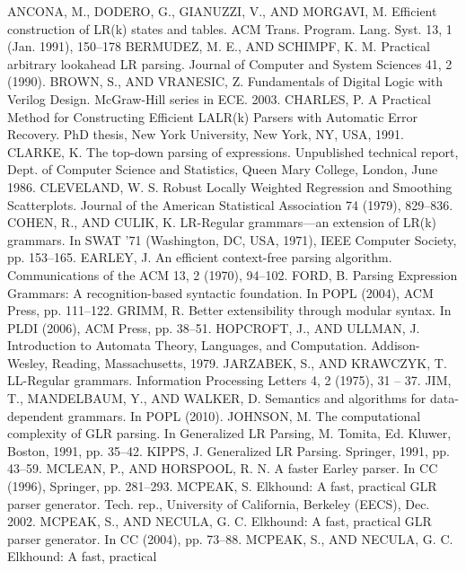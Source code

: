 \begin{thebibliography}{99}
ANCONA, M., DODERO, G., GIANUZZI, V., AND MORGAVI,
M. Efficient construction of LR(k) states and tables. ACM
Trans. Program. Lang. Syst. 13, 1 (Jan. 1991), 150–178
BERMUDEZ, M. E., AND SCHIMPF, K. M. Practical arbitrary
lookahead LR parsing. Journal of Computer and System Sciences
41, 2 (1990).
BROWN, S., AND VRANESIC, Z. Fundamentals of Digital Logic
with Verilog Design. McGraw-Hill series in ECE. 2003.
CHARLES, P. A Practical Method for Constructing Efficient
LALR(k) Parsers with Automatic Error Recovery. PhD thesis,
New York University, New York, NY, USA, 1991.
CLARKE, K. The top-down parsing of expressions. Unpublished
technical report, Dept. of Computer Science and Statistics,
Queen Mary College, London, June 1986.
CLEVELAND, W. S. Robust Locally Weighted Regression and
Smoothing Scatterplots. Journal of the American Statistical
Association 74 (1979), 829–836.
COHEN, R., AND CULIK, K. LR-Regular grammars—an extension
of LR(k) grammars. In SWAT ’71 (Washington, DC, USA,
1971), IEEE Computer Society, pp. 153–165.
EARLEY, J. An efficient context-free parsing algorithm. Communications
of the ACM 13, 2 (1970), 94–102.
FORD, B. Parsing Expression Grammars: A recognition-based
syntactic foundation. In POPL (2004), ACM Press, pp. 111–122.
GRIMM, R. Better extensibility through modular syntax. In
PLDI (2006), ACM Press, pp. 38–51.
HOPCROFT, J., AND ULLMAN, J. Introduction to Automata Theory,
Languages, and Computation. Addison-Wesley, Reading,
Massachusetts, 1979.
JARZABEK, S., AND KRAWCZYK, T. LL-Regular grammars.
Information Processing Letters 4, 2 (1975), 31 – 37.
JIM, T., MANDELBAUM, Y., AND WALKER, D. Semantics and
algorithms for data-dependent grammars. In POPL (2010).
JOHNSON, M. The computational complexity of GLR parsing.
In Generalized LR Parsing, M. Tomita, Ed. Kluwer, Boston,
1991, pp. 35–42.
KIPPS, J. Generalized LR Parsing. Springer, 1991, pp. 43–59.
MCLEAN, P., AND HORSPOOL, R. N. A faster Earley parser. In
CC (1996), Springer, pp. 281–293.
MCPEAK, S. Elkhound: A fast, practical GLR parser generator.
Tech. rep., University of California, Berkeley (EECS), Dec.
2002.
MCPEAK, S., AND NECULA, G. C. Elkhound: A fast, practical
GLR parser generator. In CC (2004), pp. 73–88.
MCPEAK, S., AND NECULA, G. C. Elkhound: A fast, practical

\end{thebibliography}
